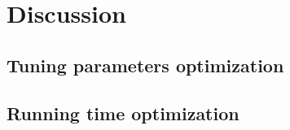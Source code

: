 
\chapter{Discussion}
\label{chap:discussion}


\section{Tuning parameters optimization}
\label{sec:discussion:parameter}






\section{Running time optimization}

